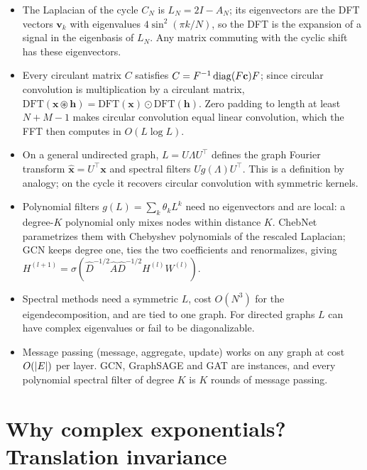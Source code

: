\begin{notechapter}
\begin{chaptersummary}
\begin{itemize}
\item The Laplacian of the cycle $C_N$ is $L_N = 2I - A_N$; its eigenvectors are the DFT vectors $\mathbf{v}_k$ with eigenvalues $4\sin^2(\pi k/N)$, so the DFT is the expansion of a signal in the eigenbasis of $L_N$. Any matrix commuting with the cyclic shift has these eigenvectors.
\item Every circulant matrix $C$ satisfies $C = F^{-1}\operatorname{diag}(F\mathbf{c})F$; since circular convolution is multiplication by a circulant matrix, $\mathrm{DFT}(\mathbf{x}\circledast\mathbf{h}) = \mathrm{DFT}(\mathbf{x})\odot\mathrm{DFT}(\mathbf{h})$. Zero padding to length at least $N+M-1$ makes circular convolution equal linear convolution, which the FFT then computes in $O(L\log L)$.
\item On a general undirected graph, $L = U\Lambda U^\top$ defines the graph Fourier transform $\hat{\mathbf{x}} = U^\top\mathbf{x}$ and spectral filters $U g(\Lambda)U^\top$. This is a definition by analogy; on the cycle it recovers circular convolution with symmetric kernels.
\item Polynomial filters $g(L) = \sum_k\theta_kL^k$ need no eigenvectors and are local: a degree-$K$ polynomial only mixes nodes within distance $K$. ChebNet parametrizes them with Chebyshev polynomials of the rescaled Laplacian; GCN keeps degree one, ties the two coefficients and renormalizes, giving $H^{(l+1)} = \sigma(\hat D^{-1/2}\hat A\hat D^{-1/2}H^{(l)}W^{(l)})$.
\item Spectral methods need a symmetric $L$, cost $O(N^3)$ for the eigendecomposition, and are tied to one graph. For directed graphs $L$ can have complex eigenvalues or fail to be diagonalizable.
\item Message passing (message, aggregate, update) works on any graph at cost $O(\left|E\right|)$ per layer. GCN, GraphSAGE and GAT are instances, and every polynomial spectral filter of degree $K$ is $K$ rounds of message passing.
\end{itemize}
\end{chaptersummary}

\chapterappendix
\section{Why complex exponentials? Translation invariance}
\label{dft-to-gnn:app:translation-invariance}


\end{notechapter}
